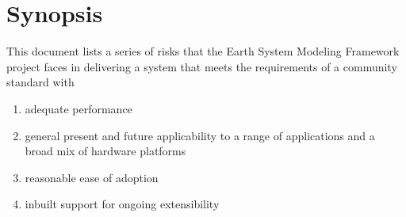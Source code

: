\documentclass[english]{article}
\begin{document}




\newpage
\tableofcontents

\newpage
\section{Synopsis}

This document lists a series of risks that the Earth System Modeling Framework project faces
in delivering a system that meets the requirements of a community standard with

\begin{enumerate}
\item adequate performance
\item general present and future applicability to a range of applications and a broad mix of hardware platforms
\item reasonable ease of adoption
\item inbuilt support for ongoing extensibility
\end{enumerate}
\end{document}
